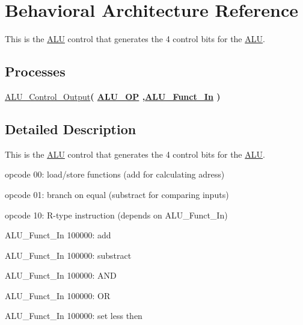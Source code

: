 \hypertarget{class_a_l_u___control_1_1_behavioral}{\section{\-Behavioral \-Architecture \-Reference}
\label{class_a_l_u___control_1_1_behavioral}
}


\-This is the \hyperlink{class_a_l_u}{\-A\-L\-U} control that generates the 4 control bits for the \hyperlink{class_a_l_u}{\-A\-L\-U}.  


\*
\*
\subsection*{\-Processes}
 \begin{DoxyCompactItemize}
\item 
\hyperlink{class_a_l_u___control_1_1_behavioral_a86f70441267014ffedcb802b679dd560}{\-A\-L\-U\-\_\-\-Control\-\_\-\-Output}{\bfseries  ( {\bfseries {\bfseries \hyperlink{class_a_l_u___control_ab5e38318e201e0011dc9fe806b2c9ea4}{\-A\-L\-U\-\_\-\-O\-P}}   ,{\bfseries \hyperlink{class_a_l_u___control_aa057cc5bea77eab736c8c526429fa204}{\-A\-L\-U\-\_\-\-Funct\-\_\-\-In}}  } )}
\end{DoxyCompactItemize}


\subsection{\-Detailed \-Description}
\-This is the \hyperlink{class_a_l_u}{\-A\-L\-U} control that generates the 4 control bits for the \hyperlink{class_a_l_u}{\-A\-L\-U}. 

opcode 00\-: load/store functions (add for calculating adress)

opcode 01\-: branch on equal (substract for comparing inputs)

opcode 10\-: \-R-\/type instruction (depends on \-A\-L\-U\-\_\-\-Funct\-\_\-\-In)

\-A\-L\-U\-\_\-\-Funct\-\_\-\-In 100000\-: add

\-A\-L\-U\-\_\-\-Funct\-\_\-\-In 100000\-: substract

\-A\-L\-U\-\_\-\-Funct\-\_\-\-In 100000\-: \-A\-N\-D

\-A\-L\-U\-\_\-\-Funct\-\_\-\-In 100000\-: \-O\-R

\-A\-L\-U\-\_\-\-Funct\-\_\-\-In 100000\-: set less then 

